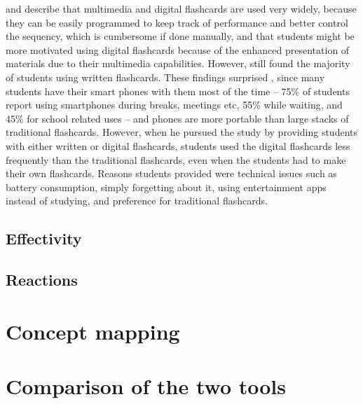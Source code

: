  and  describe that multimedia and digital flashcards are used very widely, because they can be easily programmed to keep track of performance and better control the sequency, which is cumbersome if done manually, and that students might be more motivated using digital flashcards because of the enhanced presentation of materials due to their multimedia capabilities. However,  still found the majority of students using written flashcards. These findings surprised , since many students have their smart phones with them most of the time -- 75\% of students report using smartphones during breaks, meetings etc, 55\% while waiting, and 45\% for school related uses -- and phones are more portable than large stacks of traditional flashcards. However, when he pursued the study by providing students with either written or digital flashcards, students used the digital flashcards less frequently than the traditional flashcards, even when the students had to make their own flashcards. Reasons students provided were technical issues such as battery consumption, simply forgetting about it, using entertainment apps instead of studying, and preference for traditional flashcards.

\subsection{Effectivity}



\subsection{Reactions}


\section{Concept mapping}



\section{Comparison of the two tools}

